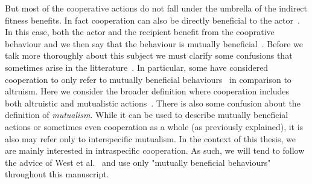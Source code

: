     But most of the cooperative actions do not fall under the umbrella of the indirect fitness benefits. In fact cooperation can also be directly beneficial to the actor~\parencite{Leimar2010}. In this case, both the actor and the recipient benefit from the cooprative behaviour and we then say that the behaviour is mutually beneficial~\parencite{West2007a}. Before we talk more thoroughly about this subject we must clarify some confusions that sometimes arise in the litterature~\parencite{Bermuller2007a}. In particular, some have considered cooperation to only refer to mutually beneficial behaviours~\parencite{Trivers1985, Lehmann2006} in comparison to altruism. Here we consider the broader definition where cooperation includes both altruistic and mutualistic actions~\parencite{West2007a}. There is also some confusion about the definition of \emph{mutualism}. While it can be used to describe mutually beneficial actions or sometimes even cooperation as a whole (as previously explained), it is also may refer only to interspecific mutualism. In the context of this thesis, we are mainly interested in intraspecific cooperation. As such, we will tend to follow the advice of West et al.~\parencite{West2007} and use only "mutually beneficial behaviours" throughout this manuscript.

